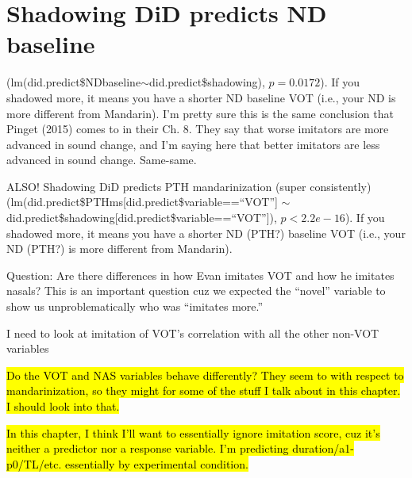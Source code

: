     \pagebreak

    \section{Shadowing DiD predicts ND baseline} (lm(did.predict\$NDbaseline$\sim$did.predict\$shadowing), $p=0.0172$). If you shadowed more, it means you have a shorter ND baseline VOT (i.e., your ND is more different from Mandarin). %
    I'm pretty sure this is the same conclusion that Pinget (2015) comes to in their Ch. 8. They say that worse imitators are more advanced in sound change, and I'm saying here that better imitators are less advanced in sound change. Same-same.

    ALSO! Shadowing DiD predicts PTH mandarinization (super consistently) \newline(lm(did.predict\$PTHms[did.predict\$variable==``VOT''] $\sim$ \newline did.predict\$shadowing[did.predict\$variable==``VOT'']), $p<2.2e-16$). If you shadowed more, it means you have a shorter ND (PTH?) baseline VOT (i.e., your ND (PTH?) is more different from Mandarin).

    Question: Are there differences in how Evan imitates VOT and how he imitates nasals? This is an important question cuz we expected the ``novel'' variable to show us unproblematically who was ``imitates more.''

    I need to look at imitation of VOT's correlation with all the other non-VOT variables
    
    \hl{Do the VOT and NAS variables behave differently? They seem to with respect to mandarinization, so they might for some of the stuff I talk about in this chapter. I should look into that.}
    
    \hl{In this chapter, I think I'll want to essentially ignore imitation score, cuz it's neither a predictor nor a response variable. I'm predicting duration/a1-p0/TL/etc. essentially by experimental condition.}